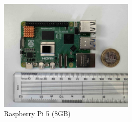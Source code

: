 \begin{figure}[H]
    \centering
    \includegraphics[width=0.6\textwidth]{contents/part-2/fig2/raspberry-pi.jpg}
    \caption{Raspberry Pi 5 (8GB)}
    \label{fig:raspberry-pi}
\end{figure}

